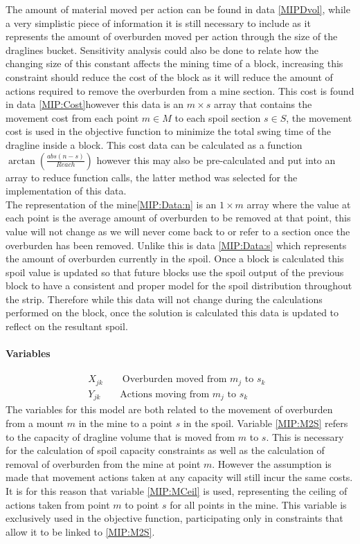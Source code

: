 The amount of material moved per action can be found in data \ref{MIPDvol}, while a very simplistic piece of information it is still necessary to include as it represents the amount of overburden moved per action through the size of the draglines bucket. Sensitivity analysis could also be done to relate how the changing size of this constant affects the mining time of a block, increasing this constraint should reduce the cost of the block as it will reduce the amount of actions required to remove the overburden from a mine section. This cost is found in data \ref{MIP:Cost}however this data is an $m\times s$ array that contains the movement cost from each point $m\in M$ to each spoil section $s \in S$, the movement cost is used in the objective function to minimize the total swing time of the dragline inside a block. This cost data can be calculated as a function $\arctan(\frac{abs(n-s)}{Reach})$ however this may also be pre-calculated and put into an array to reduce function calls, the latter method was selected for the implementation of this data. 
\\
The representation of the mine\ref{MIP:Data:n} is an $1\times m$ array where the value at each point is the average amount of overburden to be removed at that point, this value will not change as we will never come back to or refer to a section once the overburden has been removed. Unlike this is data \ref{MIP:Data:s} which represents the amount of overburden currently in the spoil. Once a block is calculated this spoil value is updated so that future blocks use the spoil output of the previous block to have a consistent and proper model for the spoil distribution throughout the strip. Therefore while this data will not change during the calculations performed on the block, once the solution is calculated this data is updated to reflect on the resultant spoil. 
\paragraph*{Variables}
\begin{align}
\label{MIP:M2S}
X_{jk} \qquad \text{Overburden moved from $m_{j}$ to $s_k$ }\\
\label{MIP:MCeil}
Y_{jk} \qquad \text{Actions moving from $m_{j}$ to $s_k$ }
\end{align}
The variables for this model are both related to the movement of overburden from a mount $m$ in the mine to a point $s$ in the spoil. Variable \ref{MIP:M2S} refers to the capacity of dragline volume that is moved from $m$ to $s$. This is necessary for the calculation of spoil capacity constraints as well as the calculation of removal of overburden from the mine at point $m$. However the assumption is made that movement actions taken at any capacity will still incur the same costs. It is for this reason that variable \ref{MIP:MCeil} is used, representing the ceiling of actions taken from point $m$ to point $s$ for all points in the mine. This variable is exclusively used in the objective function, participating only in constraints that allow it to be linked to \ref{MIP:M2S}.
